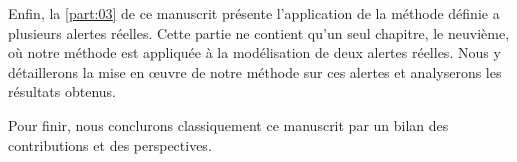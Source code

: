 Enfin, la \autoref{part:03} de ce manuscrit présente l’application de
la méthode définie a plusieurs alertes réelles. Cette partie ne
contient qu'un seul chapitre, le neuvième, où notre méthode est
appliquée à la modélisation de deux alertes réelles. Nous y
détaillerons la mise en œuvre de notre méthode sur ces alertes et
analyserons les résultats obtenus.

Pour finir, nous conclurons classiquement ce manuscrit par un bilan
des contributions et des perspectives.



